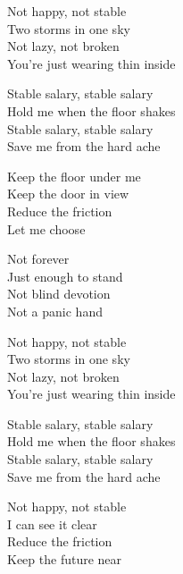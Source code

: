 \begin{lyrics}
Not happy, not stable\\
Two storms in one sky\\
Not lazy, not broken\\
You’re just wearing thin inside

Stable salary, stable salary\\
Hold me when the floor shakes\\
Stable salary, stable salary\\
Save me from the hard ache

Keep the floor under me\\
Keep the door in view\\
Reduce the friction\\
Let me choose

Not forever\\
Just enough to stand\\
Not blind devotion\\
Not a panic hand

Not happy, not stable\\
Two storms in one sky\\
Not lazy, not broken\\
You’re just wearing thin inside

Stable salary, stable salary\\
Hold me when the floor shakes\\
Stable salary, stable salary\\
Save me from the hard ache

Not happy, not stable\\
I can see it clear\\
Reduce the friction\\
Keep the future near
\end{lyrics}

